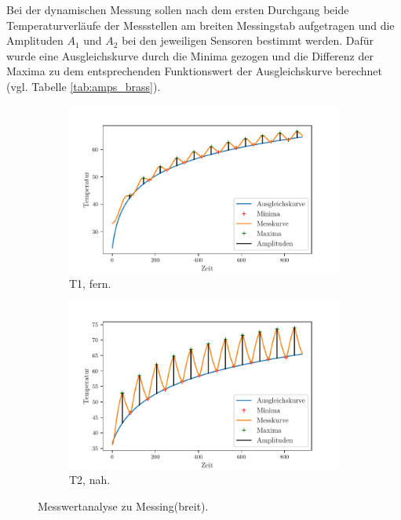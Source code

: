Bei der dynamischen Messung sollen nach dem ersten Durchgang beide Temperaturverläufe der Messstellen am breiten Messingstab 
aufgetragen und die Amplituden $A_1$ und $A_2$ bei den jeweiligen Sensoren bestimmt werden. 
Dafür wurde eine Ausgleichskurve durch die Minima gezogen und die Differenz der Maxima zu dem entsprechenden Funktionswert
der Ausgleichskurve berechnet (vgl. Tabelle \ref{tab:amps_brass}). 
\begin{figure}
    \centering
    \begin{subfigure}{.5\textwidth}
        \centering
        \includegraphics[max width=1.1\linewidth]{plots/amplitudes_brass_wide_far(t1).pdf}
        \caption{T1, fern.}
        \label{fig:plot_amps_t1}
    \end{subfigure}%
    \begin{subfigure}{.5\textwidth}
        \centering
        \includegraphics[max width=1.1\linewidth]{plots/amplitudes_brass_wide_close(t2).pdf}
        \caption{T2, nah.}
        \label{fig:plot_amps_t2}
    \end{subfigure}
    \caption{Messwertanalyse zu Messing(breit).}
    \label{fig:plots_amps_t1_t2}
\end{figure}
